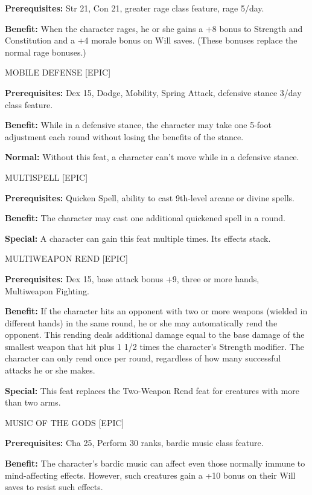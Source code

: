 \documentclass{article}
\begin{document}
\textbf{Prerequisites:} Str 21, Con 21, greater rage class feature, rage 5/day. 

\textbf{Benefit:} When the character rages, he or she gains a +8 bonus to Strength 
and Constitution and a +4 morale bonus on Will saves. (These bonuses replace the 
normal rage bonuses.) 

\vspace{12pt}
MOBILE DEFENSE [EPIC]

\textbf{Prerequisites:} Dex 15, Dodge, Mobility, Spring Attack, defensive stance 
3/day class feature. 

\textbf{Benefit:} While in a defensive stance, the character may take one 5-foot 
adjustment each round without losing the benefits of the stance. 

\textbf{Normal:} Without this feat, a character can't move while in a defensive 
stance. 

\vspace{12pt}
MULTISPELL [EPIC] 

\textbf{Prerequisites:} Quicken Spell, ability to cast 9th-level arcane or divine 
spells. 

\textbf{Benefit:} The character may cast one additional quickened spell in a round. 

\textbf{Special:} A character can gain this feat multiple times. Its effects stack. 

\vspace{12pt}
MULTIWEAPON REND [EPIC] 

\textbf{Prerequisites:} Dex 15, base attack bonus +9, three or more hands, Multiweapon 
Fighting. 

\textbf{Benefit:} If the character hits an opponent with two or more weapons (wielded 
in different hands) in the same round, he or she may automatically rend the opponent. 
This rending deals additional damage equal to the base damage of the smallest weapon 
that hit plus 1 1/2 times the character's Strength modifier. The character can 
only rend once per round, regardless of how many successful attacks he or she makes. 

\textbf{Special:} This feat replaces the Two-Weapon Rend feat for creatures with 
more than two arms. 

\vspace{12pt}
MUSIC OF THE GODS [EPIC] 

\textbf{Prerequisites:} Cha 25, Perform 30 ranks, bardic music class feature. 

\textbf{Benefit:} The character's bardic music can affect even those normally immune 
to mind-affecting effects. However, such creatures gain a +10 bonus on their Will 
saves to resist such effects. 
\end{document}
